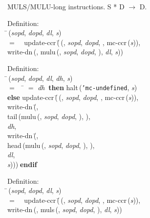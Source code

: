  MULS/MULU-long instructions.  S * D $\rightarrow$ D.
\begin{tabbing}{\sc Definition}: \\  
\=\,({\it{sopd\/}}, {\it{dopd\/}}, {\it{dl\/}}, {\it{s\/}}) \\ 
$=$$\;\;\;\;${\rm{update-ccr}}\,(\=\,({}, {\it{sopd\/}}, {\it{dopd\/}}, {}, {\rm{mc-ccr}}\,({\it{s\/}})), \\ 
{\rm{write-dn}}\,({}, {\rm{mulu}}\,({}, {\it{sopd\/}}, {\it{dopd\/}}, {}), {\it{dl\/}}, {\it{s\/}}))\-\-
\end{tabbing}

\begin{tabbing}{\sc Definition}: \\  
\=\,({\it{sopd\/}}, {\it{dopd\/}}, {\it{dl\/}}, {\it{dh\/}}, {\it{s\/}}) \\ 
$=$$\;\;\;\;$\= $=$ {\it{dh\/}}$\;\;${\bf then }{\rm{halt}}\,({\tt{'}}{\tt{mc-undefined}}, {\it{s\/}}) \\ 
{\bf else }{\rm{update-ccr}}\,(\=\,({}, {\it{sopd\/}}, {\it{dopd\/}}, {}, {\rm{mc-ccr}}\,({\it{s\/}})), \\ 
{\rm{write-dn}}\,(\=, \\ 
{\rm{tail}}\,({\rm{mulu}}\,({}, {\it{sopd\/}}, {\it{dopd\/}}, {}), {}), \\ 
{\it{dh\/}}, \\ 
{\rm{write-dn}}\,(\=, \\ 
{\rm{head}}\,({\rm{mulu}}\,({}, {\it{sopd\/}}, {\it{dopd\/}}, {}), {}), \\ 
{\it{dl\/}}, \\ 
{\it{s\/}})\-)\-)\-$\;${\bf  endif}\-\-
\end{tabbing}

\begin{tabbing}{\sc Definition}: \\  
\=\,({\it{sopd\/}}, {\it{dopd\/}}, {\it{dl\/}}, {\it{s\/}}) \\ 
$=$$\;\;\;\;${\rm{update-ccr}}\,(\=\,({}, {\it{sopd\/}}, {\it{dopd\/}}, {}, {\rm{mc-ccr}}\,({\it{s\/}})), \\ 
{\rm{write-dn}}\,({}, {\rm{muls}}\,({}, {\it{sopd\/}}, {\it{dopd\/}}, {}), {\it{dl\/}}, {\it{s\/}}))\-\-
\end{tabbing}

